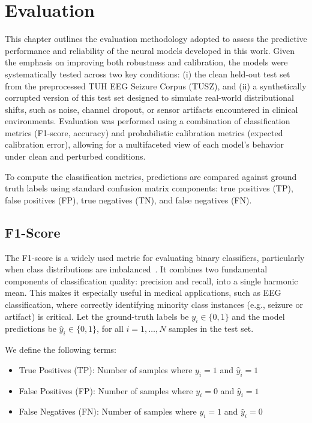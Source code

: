 \section{Evaluation}
This chapter outlines the evaluation methodology adopted to assess the predictive performance and reliability of the neural models developed in this work. Given the emphasis on improving both robustness and calibration, the models were systematically tested across two key conditions: (i) the clean held-out test set from the preprocessed TUH EEG Seizure Corpus (TUSZ), and (ii) a synthetically corrupted version of this test set designed to simulate real-world distributional shifts, such as noise, channel dropout, or sensor artifacts encountered in clinical environments. Evaluation was performed using a combination of classification metrics (F1-score, accuracy) and probabilistic calibration metrics (expected calibration error), allowing for a multifaceted view of each model’s behavior under clean and perturbed conditions.

To compute the classification metrics, predictions are compared against ground truth labels using standard confusion matrix components: true positives (TP), false positives (FP), true negatives (TN), and false negatives (FN).

\subsection*{F1-Score}
The F1-score is a widely used metric for evaluating binary classifiers, particularly when class distributions are imbalanced~\cite{f1}. It combines two fundamental components of classification quality: precision and recall, into a single harmonic mean. This makes it especially useful in medical applications, such as EEG classification, where correctly identifying minority class instances (e.g., seizure or artifact) is critical.
Let the ground-truth labels be \( y_i \in \{0, 1\} \) and the model predictions be \( \hat{y}_i \in \{0, 1\} \), for all \( i = 1, \ldots, N \) samples in the test set.

We define the following terms:
\begin{itemize}
    \item True Positives (TP): Number of samples where \( y_i = 1 \) and \( \hat{y}_i = 1 \)
    \item False Positives (FP): Number of samples where \( y_i = 0 \) and \( \hat{y}_i = 1 \)
    \item False Negatives (FN): Number of samples where \( y_i = 1 \) and \( \hat{y}_i = 0 \)
\end{itemize}

